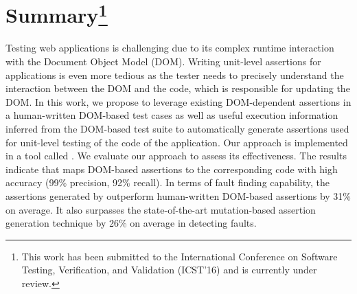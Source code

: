\section*{Summary\footnote{This work has been submitted to the International Conference on Software Testing, Verification, and Validation (ICST'16) and is currently under review.}}
Testing \javascript web applications is challenging due to its complex runtime interaction with the Document Object Model (DOM). Writing unit-level assertions for \javascript applications is even more tedious as the tester needs to precisely understand the interaction between the DOM and the \javascript code, which is responsible for updating the DOM. In this work, we propose to leverage existing DOM-dependent assertions in a human-written DOM-based test cases as well as useful execution information inferred from the DOM-based test suite to automatically generate assertions used for unit-level testing of the \javascript code of the application. Our approach is implemented in a tool called \atrina. We evaluate our approach to assess its effectiveness. The results indicate that \atrina maps DOM-based assertions to the corresponding \javascript code with high accuracy (99\% precision, 92\% recall). In terms of fault finding capability, the assertions generated by \atrina outperform human-written DOM-based assertions by 31\% on average. It also surpasses the state-of-the-art mutation-based assertion generation technique by 26\% on average in detecting faults.  